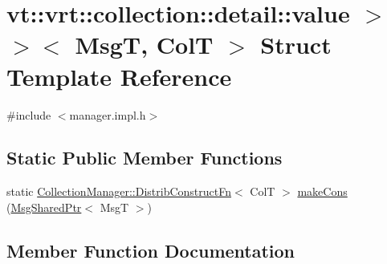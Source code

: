\hypertarget{structvt_1_1vrt_1_1collection_1_1detail_1_1_insert_msg_dispatcher_3_01_msg_t_00_01_col_t_00_01st21bfbb9f37f35dd344d97132b3f17280}{}\section{vt\+:\+:vrt\+:\+:collection\+:\+:detail\+:\+:value $>$$>$$<$ MsgT, ColT $>$ Struct Template Reference}
\label{structvt_1_1vrt_1_1collection_1_1detail_1_1_insert_msg_dispatcher_3_01_msg_t_00_01_col_t_00_01st21bfbb9f37f35dd344d97132b3f17280}


{\ttfamily \#include $<$manager.\+impl.\+h$>$}

\subsection*{Static Public Member Functions}
\begin{DoxyCompactItemize}
\item 
static \hyperlink{structvt_1_1vrt_1_1collection_1_1_collection_manager_a7503830bc133013d542856fa39834dcc}{Collection\+Manager\+::\+Distrib\+Construct\+Fn}$<$ ColT $>$ \hyperlink{structvt_1_1vrt_1_1collection_1_1detail_1_1_insert_msg_dispatcher_3_01_msg_t_00_01_col_t_00_01st21bfbb9f37f35dd344d97132b3f17280_a56b771d6ce66b4fb63a3a588aaf7b34f}{make\+Cons} (\hyperlink{namespacevt_ab2b3d506ec8e8d1540aede826d84a239}{Msg\+Shared\+Ptr}$<$ MsgT $>$)
\end{DoxyCompactItemize}


\subsection{Member Function Documentation}
\mbox{\label{structvt_1_1vrt_1_1collection_1_1detail_1_1_insert_msg_dispatcher_3_01_msg_t_00_01_col_t_00_01st21bfbb9f37f35dd344d97132b3f17280_a56b771d6ce66b4fb63a3a588aaf7b34f}} 
